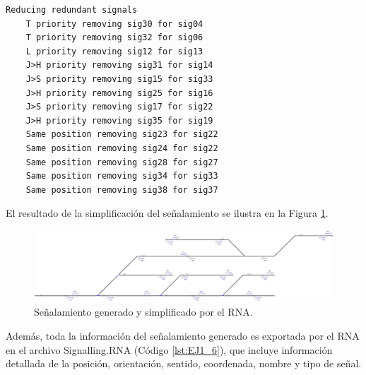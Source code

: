 	\begin{lstlisting}[language = {}, caption = Reducción de señalamiento por prioridad de señales, label = {lst:EJ6_3}]
	Reducing redundant signals
	T priority removing sig30 for sig04
	T priority removing sig32 for sig06
	L priority removing sig12 for sig13
	J>H priority removing sig31 for sig14
	J>S priority removing sig15 for sig33
	J>H priority removing sig25 for sig16
	J>S priority removing sig17 for sig22
	J>H priority removing sig35 for sig19
	Same position removing sig23 for sig22
	Same position removing sig24 for sig22
	Same position removing sig28 for sig27
	Same position removing sig34 for sig33
	Same position removing sig38 for sig37
	\end{lstlisting}

	El resultado de la simplificación del señalamiento se ilustra en la Figura \ref{fig:EJ6_7}.
	
	 \begin{figure}[H]
		\centering
		\includegraphics[width=1\textwidth]{resultados-obtenidos/ejemplo6/images/6_RNA.png}
		\centering\caption{Señalamiento generado y simplificado por el RNA.}
		\label{fig:EJ6_7}
	\end{figure}

	Además, toda la información del señalamiento generado es exportada por el RNA en el archivo Signalling.RNA (Código \ref{lst:EJ1_6}), que incluye información detallada de la posición, orientación, sentido, coordenada, nombre y tipo de señal.
	
